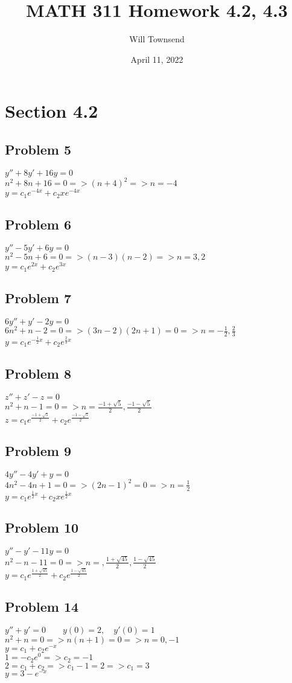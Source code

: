 \documentclass[12pt]{exam}
\title{\textbf{MATH 311 Homework 4.2, 4.3}}
\author{Will Townsend}
\date{April 11, 2022}
\begin{document}
\maketitle
\section*{Section 4.2}
\subsection*{Problem 5}
$y''+8y'+16y=0$\\
$n^2+8n+16=0=>(n+4)^2=>n=-4$\\
$y=c_1e^{-4x}+c_2xe^{-4x}$
\subsection*{Problem 6}
$y''-5y'+6y=0$\\
$n^2-5n+6=0=>(n-3)(n-2)=>n=3,2$\\
$y=c_1e^{2x}+c_2e^{3x}$
\subsection*{Problem 7}
$6y''+y'-2y=0$\\
$6n^2+n-2=0=>(3n-2)(2n+1)=0=>n=-\frac{1}{2},\frac{2}{3}$\\
$y=c_1e^{-\frac{1}{2}x}+c_2e^{\frac{2}{3}x}$
\subsection*{Problem 8}
$z''+z'-z=0$\\
$n^2+n-1=0=>n=\frac{-1+\sqrt{5}}{2},\frac{-1-\sqrt{5}}{2}$\\
$z=c_1e^{\frac{-1+\sqrt{5}}{2}}+c_2e^{\frac{-1-\sqrt{5}}{2}}$
\subsection*{Problem 9}
$4y''-4y'+y=0$\\
$4n^2-4n+1=0=>(2n-1)^2=0=>n=\frac{1}{2}$\\
$y=c_1e^{\frac{1}{2}x}+c_2xe^{\frac{1}{2}x}$
\subsection*{Problem 10}
$y''-y'-11y=0$\\
$n^2-n-11=0=>n=,\frac{1+\sqrt{45}}{2},\frac{1-\sqrt{45}}{2}$\\
$y=c_1e^{\frac{1+\sqrt{45}}{2}}+c_2e^{\frac{1-\sqrt{45}}{2}}$
\subsection*{Problem 14}
$y''+y'=0\qquad y(0)=2,\quad y'(0)=1$\\
$n^2+n=0=>n(n+1)=0=>n=0,-1$\\
$y=c_1+c_2e^{-x}$\\
$1=-c_2e^0=>c_2=-1$\\
$2=c_1+c_2=>c_1-1=2=>c_1=3$\\
$y=3-e^{-x}$
\end{document}
